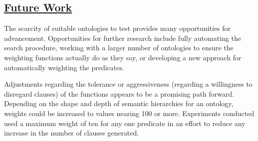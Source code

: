 \documentclass{article}
\begin{document}
\subsection{\underline{Future Work}}
The scarcity of suitable ontologies to test provides many opportunities for advancement. Opportunities for further research include fully automating the search procedure, working with a larger number of ontologies to ensure the weighting functions actually do as they say, or developing a new approach for  automatically weighting the predicates. 

Adjustments regarding the tolerance or aggressiveness (regarding a willingness to disregard clauses) of the functions appears to be a promising path forward. Depending on the shape and depth of semantic hierarchies for an ontology, weights could be increased to values nearing 100 or more. Experiments conducted used a maximum weight of ten for any one predicate in an effort to reduce any increase in the number of clauses generated. 

\newpage
{}
\vspace*{.05in}
\printbibliography

\newpage
\appendix
\end{document}
